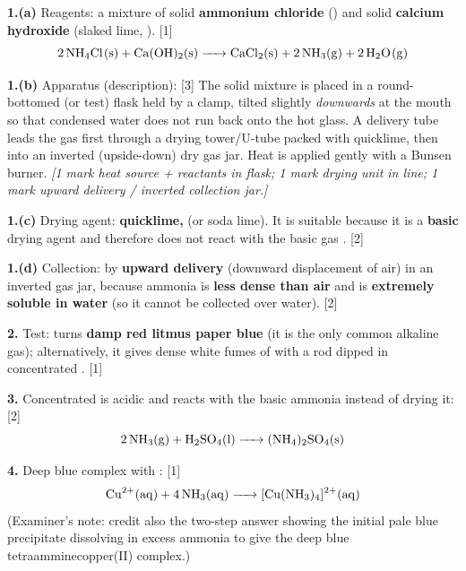\documentclass[11pt]{article}
\begin{document}
\begin{corrige}
\textbf{1.(a)} Reagents: a mixture of solid \textbf{ammonium chloride} () and solid \textbf{calcium hydroxide} (slaked lime, ). \hfill [1]
\[ \ce{2NH4Cl(s) + Ca(OH)2(s) -> CaCl2(s) + 2NH3(g) + 2H2O(g)} \]

\textbf{1.(b)} Apparatus (description): \hfill [3]
The solid mixture is placed in a round-bottomed (or test) flask held by a clamp, tilted slightly \emph{downwards} at the mouth so that condensed water does not run back onto the hot glass. A delivery tube leads the gas first through a drying tower/U-tube packed with quicklime, then into an inverted (upside-down) dry gas jar. Heat is applied gently with a Bunsen burner.
\emph{[1 mark heat source + reactants in flask; 1 mark drying unit in line; 1 mark upward delivery / inverted collection jar.]}

\textbf{1.(c)} Drying agent: \textbf{quicklime, } (or soda lime). It is suitable because it is a \textbf{basic} drying agent and therefore does not react with the basic gas . \hfill [2]

\textbf{1.(d)} Collection: by \textbf{upward delivery} (downward displacement of air) in an inverted gas jar, because ammonia is \textbf{less dense than air} and is \textbf{extremely soluble in water} (so it cannot be collected over water). \hfill [2]

\textbf{2.} Test:  turns \textbf{damp red litmus paper blue} (it is the only common alkaline gas); alternatively, it gives dense white fumes of  with a rod dipped in concentrated . \hfill [1]

\textbf{3.} Concentrated  is acidic and reacts with the basic ammonia instead of drying it: \hfill [2]
\[ \ce{2NH3(g) + H2SO4(l) -> (NH4)2SO4(s)} \]

\textbf{4.} Deep blue complex with : \hfill [1]
\[ \ce{Cu^{2+}(aq) + 4NH3(aq) -> [Cu(NH3)4]^{2+}(aq)} \]
(Examiner's note: credit also the two-step answer showing the initial pale blue precipitate  dissolving in excess ammonia to give the deep blue tetraamminecopper(II) complex.)
\end{corrige}
\end{document}
